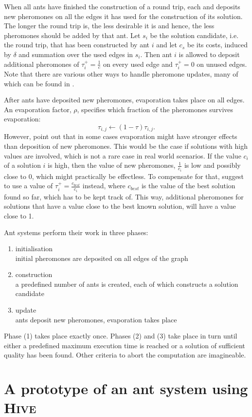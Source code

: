 When all ants have finished the construction of a round trip, each and deposits new pheromones on all the edges it has used for the construction of its solution. The longer the round trip is, the less desirable it is and hence, the less pheromones should be added by that ant. Let $s_i$ be the solution candidate, i.e. the round trip, that has been constructed by ant $i$ and let $c_s$ be its costs, induced by $\delta$ and summation over the used edges in $s_i$. Then ant $i$ is allowed to deposit additional pheromones of $\tau_i^+ = \frac{1}{c}$ on every used edge and $\tau_i^+ = 0$ on unused edges. Note that there are various other ways to handle pheromone updates, many of which can be found in \cite{Dorigo:2004:ACO:975277}.

After ants have deposited new pheromones, evaporation takes place on all edges. An evaporation factor, $\rho$, specifies which fraction of the pheromones survives evaporation:
\begin{equation}
  \label{eqn:evaporation}
  \tau_{i,j} \leftarrow \left( 1 - \tau \right) \tau_{i,j}.
\end{equation}
However, \cite{Bloecker} point out that in some cases evaporation might have stronger effects than deposition of new pheromones. This would be the case if solutions with high values are involved, which is not a rare case in real world scenarios. If the value $c_i$ of a solution $i$ is high, then the value of new pheromones, $\frac{1}{c_i}$ is low and possibly close to $0$, which might practically be effectless. To compensate for that, \cite{Bloecker} suggest to use a value of $\tau_i^+ = \frac{c_{best}}{c_i}$ instead, where $c_{best}$ is the value of the best solution found so far, which has to be kept track of. This way, additional pheromones for solutions that have a value close to the best known solution, will have a value close to 1.

Ant systems perform their work in three phases:
\begin{enumerate}
  \item initialisation \\
    initial pheromones are deposited on all edges of the graph
  \item construction \\
    a predefined number of ants is created, each of which constructs a solution candidate
  \item update \\
    ants deposit new pheromones, evaporation takes place
\end{enumerate}
Phase (1) takes place exactly once. Phases (2) and (3) take place in turn until either a predefined maximum execution time is reached or a solution of sufficient quality has been found. Other criteria to abort the computation are imagineable.

\section{A prototype of an ant system using \textsc{Hive}}